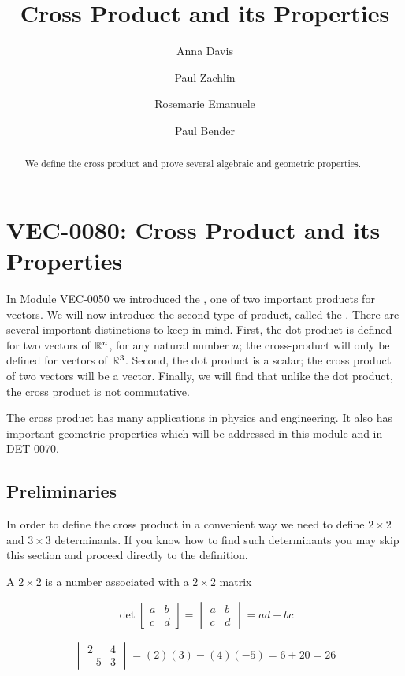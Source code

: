 \documentclass{ximera}
\author{Anna Davis \and Paul Zachlin \and Rosemarie Emanuele \and Paul Bender} \title{Cross Product and its Properties} \license{CC-BY 4.0}
\begin{document}
\begin{abstract}
 We define the cross product and prove several algebraic and geometric properties.
\end{abstract}
\maketitle
\section*{VEC-0080:  Cross Product and its Properties}
In Module VEC-0050 we introduced the , one of two important products for vectors.  We will now introduce the second type of product, called the .  There are several important distinctions to keep in mind.  First, the dot product is defined for two vectors of $\mathbb{R}^n$, for any  natural number $n$; the cross-product will only be defined for vectors of $\mathbb{R}^3$.  Second, the dot product is a scalar; the cross product of two vectors will be a vector.  Finally, we will find that unlike the dot product, the cross product is not commutative.  

The cross product has many applications in physics and engineering.  It also has important geometric properties which will be addressed in this module and in DET-0070.

\subsection*{Preliminaries}
In order to define the cross product in a convenient way we need to define $2\times 2$ and $3\times 3$ determinants.  If you know how to find such determinants you may skip this section and proceed directly to the definition.

\begin{definition}\label{def:twodetcrossprod}
A $2\times 2$  is a number associated with a $2\times 2$ matrix

$$\det{\begin{bmatrix}
a & b\\
c & d
\end{bmatrix}}=\begin{vmatrix}
a & b\\
c & d
\end{vmatrix} =ad-bc$$

\end{definition}

\begin{example} \label{ex:twodetcrossprod}
$$\begin{vmatrix}
2 & 4\\
-5 & 3
\end{vmatrix} =(2)(3)-(4)(-5)=6+20=26$$
\end{example}
\end{document}

